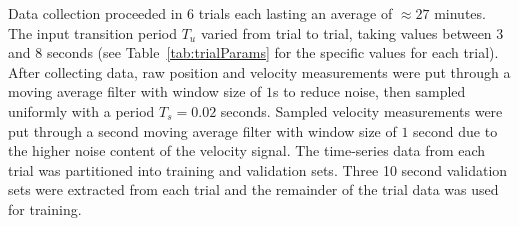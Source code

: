 
Data collection proceeded in 6 trials each lasting an average of $\approx27$ minutes.
The input transition period $T_u$ varied from trial to trial, taking values between 3 and 8 seconds (see Table~\ref{tab:trialParams} for the specific values for each trial).
After collecting data, raw position and velocity measurements were put through a moving average filter with window size of $1$s to reduce noise, then sampled uniformly with a period $T_s = 0.02$ seconds.
Sampled velocity measurements were put through a second moving average filter with window size of $1$ second due to the higher noise content of the velocity signal.
The time-series data from each trial was partitioned into training and validation sets. 
Three 10 second validation sets were extracted from each trial and the remainder of the trial data was used for training.

